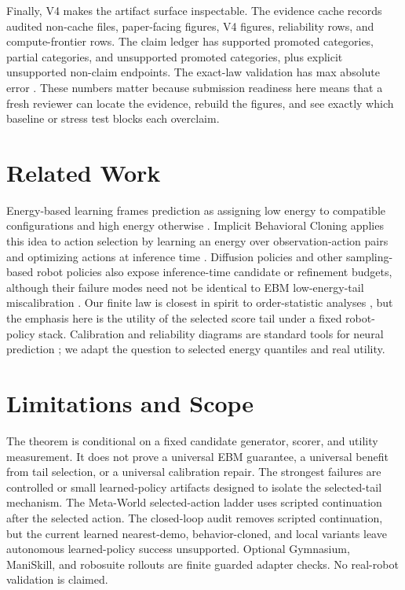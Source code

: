 \documentclass{article}
\begin{document}
Finally, V4 makes the artifact surface inspectable. The evidence cache records
\VFourEBMArtifactFiles{} audited non-cache files, \VFourEBMFigureFiles{}
paper-facing figures, \VFourEBMVFourFigures{} V4 figures,
\VFourEBMReliabilityRows{} reliability rows, and
\VFourEBMOptimizationRows{} compute-frontier rows. The claim ledger has
\VFourEBMSupportedClaims{} supported promoted categories,
\VFourEBMPartialClaims{} partial categories, and
\VFourEBMUnsupportedClaims{} unsupported promoted categories, plus
\VFourEBMNonClaimBoundaries{} explicit unsupported non-claim endpoints. The
exact-law validation has max absolute error \VFourEBMExactMaxError{}. These
numbers matter because submission readiness here means that a fresh reviewer
can locate the evidence, rebuild the figures, and see exactly which baseline
or stress test blocks each overclaim.

\section{Related Work}

Energy-based learning frames prediction as assigning low energy to compatible configurations and high energy otherwise \citep{lecun2006tutorial,du2019implicit}. Implicit Behavioral Cloning applies this idea to action selection by learning an energy over observation-action pairs and optimizing actions at inference time \citep{florence2022implicit}. Diffusion policies and other sampling-based robot policies also expose inference-time candidate or refinement budgets, although their failure modes need not be identical to EBM low-energy-tail miscalibration \citep{chi2023diffusionpolicy}. Our finite law is closest in spirit to order-statistic analyses \citep{david2003order}, but the emphasis here is the utility of the selected score tail under a fixed robot-policy stack. Calibration and reliability diagrams are standard tools for neural prediction \citep{guo2017calibration}; we adapt the question to selected energy quantiles and real utility.

\section{Limitations and Scope}

The theorem is conditional on a fixed candidate generator, scorer, and utility measurement. It does not prove a universal EBM guarantee, a universal benefit from tail selection, or a universal calibration repair. The strongest failures are controlled or small learned-policy artifacts designed to isolate the selected-tail mechanism. The Meta-World selected-action ladder uses scripted continuation after the selected action. The closed-loop audit removes scripted continuation, but the current learned nearest-demo, behavior-cloned, and local variants leave autonomous learned-policy success unsupported. Optional Gymnasium, ManiSkill, and robosuite rollouts are finite guarded adapter checks. No real-robot validation is claimed.
\end{document}
